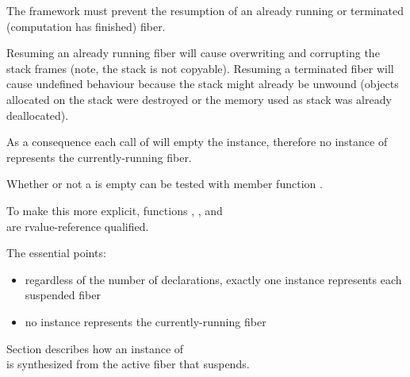 \label{invalidation}

The framework must prevent the resumption of an already running or terminated
(computation has finished) fiber.

Resuming an already running fiber will cause overwriting and corrupting the stack
frames (note, the stack is not copyable).  Resuming a terminated fiber will
cause undefined behaviour because the stack might already be unwound (objects
allocated on the stack were destroyed or the memory used as stack was already
deallocated).

As a consequence each call of \resume will empty the \fiber instance, therefore
no instance of \fiber represents the currently-running fiber.

Whether or not a \fiber is empty can be tested with member function \opbool.

To make this more explicit, functions \resume, \resumewith, \xtresume
and\\
\xtresumewith are rvalue-reference qualified.

The essential points:
\begin{itemize}
    \item regardless of the number of \fiber declarations, exactly one \fiber
          instance represents each suspended fiber
    \item no \fiber instance represents the currently-running fiber
\end{itemize}

Section  describes how an instance of\\
\fiber is synthesized from the active fiber that suspends.

